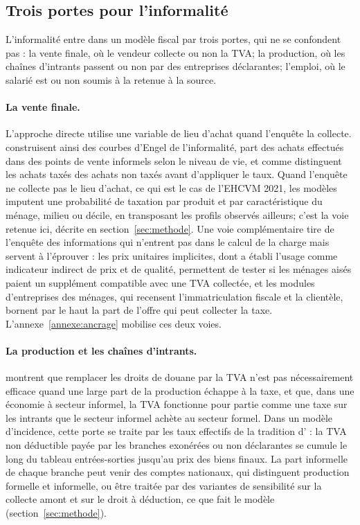 \documentclass[11pt,a4paper]{article}
\begin{document}
\subsection{Trois portes pour l'informalité}

L'informalité entre dans un modèle fiscal par trois portes, qui ne se
confondent pas : la vente finale, où le vendeur collecte ou non la TVA; la
production, où les chaînes d'intrants passent ou non par des entreprises
déclarantes; l'emploi, où le salarié est ou non soumis à la retenue à la source.

\paragraph{La vente finale.} L'approche directe utilise une variable de lieu
d'achat quand l'enquête la collecte. \citet{bachas2024} construisent ainsi des
courbes d'Engel de l'informalité, part des achats effectués dans des points de
vente informels selon le niveau de vie, et \citet{warwick2022} comme
\citet{harris2018} distinguent les achats taxés des achats non taxés avant
d'appliquer le taux. Quand l'enquête ne collecte pas le lieu d'achat, ce qui est
le cas de l'EHCVM 2021, les modèles imputent une probabilité de taxation par
produit et par caractéristique du ménage, milieu ou décile, en transposant les
profils observés ailleurs; c'est la voie retenue ici, décrite en
section~\ref{sec:methode}. Une voie complémentaire tire de l'enquête des
informations qui n'entrent pas dans le calcul de la charge mais servent à
l'éprouver : les prix unitaires implicites, dont \citet{deaton1988} a établi
l'usage comme indicateur indirect de prix et de qualité, permettent de tester
si les ménages aisés paient un supplément compatible avec une TVA collectée, et
les modules d'entreprises des ménages, qui recensent l'immatriculation fiscale
et la clientèle, bornent par le haut la part de l'offre qui peut collecter la
taxe. L'annexe~\ref{annexe:ancrage} mobilise ces deux voies.

\paragraph{La production et les chaînes d'intrants.}
\citet{emranstiglitz2005} montrent que remplacer les droits de douane par la
TVA n'est pas nécessairement efficace quand une large part de la production
échappe à la taxe, et \citet{keen2008} que, dans une économie à secteur
informel, la TVA fonctionne pour partie comme une taxe sur les intrants que le
secteur informel achète au secteur formel. Dans un modèle d'incidence, cette
porte se traite par les taux effectifs de la tradition
d'\citet{ahmadstern1984} : la TVA non déductible payée par les branches
exonérées ou non déclarantes se cumule le long du tableau entrées-sorties
jusqu'au prix des biens finaux. La part informelle de chaque branche peut venir
des comptes nationaux, qui distinguent production formelle et informelle, ou
être traitée par des variantes de sensibilité sur la collecte amont et sur le
droit à déduction, ce que fait le modèle (section~\ref{sec:methode}).
\end{document}
